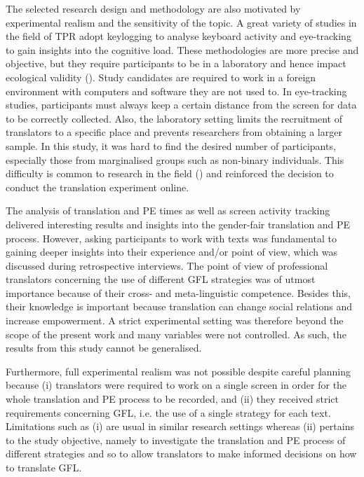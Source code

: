 The selected research design and methodology are also motivated by experimental realism and the sensitivity of the topic. A great variety of studies in the field of TPR adopt keylogging to analyse keyboard activity and eye-tracking to gain insights into the cognitive load. These methodologies are more precise and objective, but they require participants to be in a laboratory and hence impact ecological validity (\cite{o2009eye}). Study candidates are required to work in a foreign environment with computers and software they are not used to. In eye-tracking studies, participants must always keep a certain distance from the screen for data to be correctly collected. Also, the laboratory setting limits the recruitment of translators to a specific place and prevents researchers from obtaining a larger sample. In this study, it was hard to find the desired number of participants, especially those from marginalised groups such as non-binary individuals. This difficulty is common to research in the field (\cite{burtscher-2022-genderfairmt}) and reinforced the decision to conduct the translation experiment online. 

The analysis of translation and PE times as well as screen activity tracking delivered interesting results and insights into the gender-fair translation and PE process. However, asking participants to work with texts was fundamental to gaining deeper insights into their experience and/or point of view, which was discussed during retrospective interviews. The point of view of professional translators concerning the use of different GFL strategies was of utmost importance because of their cross- and meta-linguistic competence. Besides this, their knowledge is important because translation can change social relations and increase empowerment. A strict experimental setting was therefore beyond the scope of the present work and many variables were not controlled. As such, the results from this study cannot be generalised.

Furthermore, full experimental realism was not possible despite careful planning because (i) translators were required to work on a single screen in order for the whole translation and PE process to be recorded, and (ii) they received strict requirements concerning GFL, i.e. the use of a single strategy for each text. Limitations such as (i) are usual in similar research settings whereas (ii) pertains to the study objective, namely to investigate the translation and PE process of different strategies and so to allow translators to make informed decisions on how to translate GFL. 

